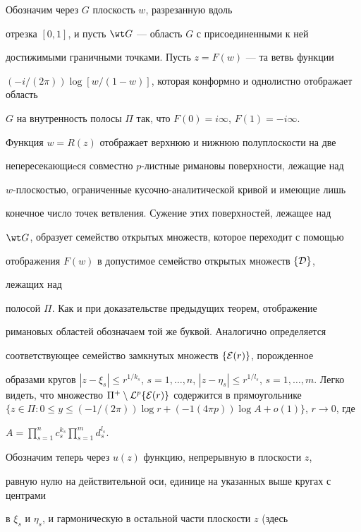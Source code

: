 \begin{pf}


Обозначим через $G$ плоскость $w$, разрезанную вдоль


отрезка $[0,1]$, и пусть $\wt G$ --- область $G$ с присоединенными к ней


достижимыми граничными точками. Пусть $z=F(w)$ --- та ветвь функции


$(-i/(2\pi))\log[w/(1-w)]$, которая конформно и однолистно отображает область


$G$ на внутренность полосы $\Pi$ так, что $F(0)=i\infty$, $F(1)=-i\infty$.


Функция $w=R(z)$ отображает верхнюю и нижнюю полуплоскости на две


непересекающиeся совместно $p$-листные римановы поверхности, лежащие над


$w$-плоскостью, ограниченные кусочно-аналитической кривой и имеющие лишь


конечное число точек ветвления. Сужение этих поверхностей, лежащее над


$\wt G$, образует семейство открытых множеств, которое переходит с помощью


отображения $F(w)$ в допустимое семейство открытых множеств $\{{\cal D}\}$,


лежащих над


полосой $\Pi$. Как и при доказательстве предыдущих теорем, отображение


римановых областей обозначаем той же буквой. Аналогично определяется


соответствующее семейство замкнутых множеств $\{{\cal E}(r)\}$, порожденное


образами кругов $|z-\xi_s|\leq r^{1/k_s}$, $s=1,\dotsc,n$, $|z-\eta_s|\leq


r^{1/l_s}$, $s=1,\dotsc,m$. Легко видеть, что множество $\Pi^+\setminus


{\cal L}^p\{{\cal E}(r)\}$ содержится в прямоугольнике $\{z\in\Pi:


0\leq y\leq(-1/(2\pi))\log r+(-1(4\pi p))\log A+o(1)\}$, $r\to0$, где


$A=\prod\limits_{s=1}^{n}c_s^{k_s}\prod\limits_{s=1}^{m}d_s^{l_s}$.


Обозначим теперь через $u(z)$ функцию, непрерывную в плоскости $z$,


равную нулю на действительной оси, единице на указанных выше кругах с центрами


в $\xi_s$ и $\eta_s$, и гармоническую в остальной части плоскости $z$ (здесь



\end{pf}

